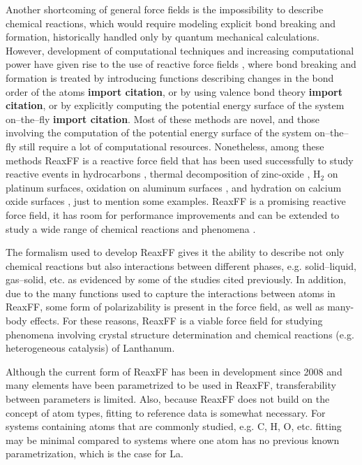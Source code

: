 \documentclass[journal=jpcafh,manuscript=article]{achemso}
\begin{document}
Another shortcoming of general force fields is the impossibility to describe chemical reactions, which would require modeling explicit bond breaking and formation, historically handled only by quantum mechanical calculations.
However, development of computational techniques and increasing computational power have given rise to the use of reactive force fields \cite{meuwly2019reactive}, where bond breaking and formation is treated by introducing functions describing changes in the bond order of the atoms \textbf{import citation}, or by using valence bond theory \textbf{import citation}, or by explicitly computing the potential energy surface of the system on--the--fly \textbf{import citation}.
Most of these methods are novel, and those involving the computation of the potential energy surface of the system on--the--fly still require a lot of computational resources.
Nonetheless, among these methods ReaxFF \cite{van2001reaxff,chenoweth_reaxff_2008} is a reactive force field that has been used successfully to study reactive events in hydrocarbons \cite{van2001reaxff}, thermal decomposition of zinc-oxide \cite{russo2011atomistic}, H$_2$ on platinum surfaces, oxidation on aluminum surfaces \cite{ludwig2006dynamics}, and hydration on calcium oxide surfaces \cite{manzano_hydration_2012}, just to mention some examples.
ReaxFF is a promising reactive force field, it has room for performance improvements and can be extended to study a wide range of chemical reactions and phenomena \cite{senftle_reaxff_2016}.

The formalism used to develop ReaxFF gives it the ability to describe not only chemical reactions but also interactions between different phases, e.g. solid--liquid, gas--solid, etc. as evidenced by some of the studies cited previously.
In addition, due to the many functions used to capture the interactions between atoms in ReaxFF, some form of polarizability is present in the force field, as well as many-body effects.
For these reasons, ReaxFF is a viable force field for studying phenomena involving crystal structure determination and chemical reactions (e.g. heterogeneous catalysis) of Lanthanum.

Although the current form of ReaxFF has been in development since 2008 \cite{chenoweth_reaxff_2008} and many elements have been parametrized to be used in ReaxFF, transferability between parameters is limited.
Also, because ReaxFF does not build on the concept of atom types, fitting to reference data is somewhat necessary.
For systems containing atoms that are commonly studied, e.g. C, H, O, etc. fitting may be minimal compared to systems where one atom has no previous known parametrization, which is the case for La.
\end{document}
